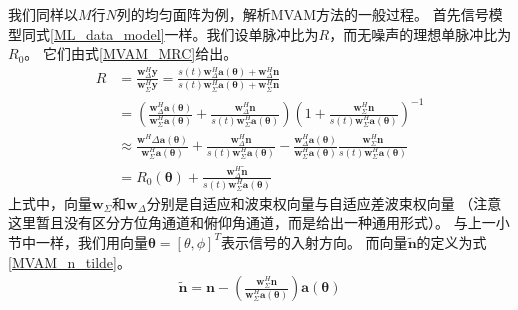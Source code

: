 \documentclass[master]{thesis-uestc}
\begin{document}
我们同样以$M$行$N$列的均匀面阵为例，解析MVAM方法的一般过程。
首先信号模型同式\eqref{ML_data_model}一样。我们设单脉冲比为$R$，而无噪声的理想单脉冲比为$R_0$。
它们由式\eqref{MVAM_MRC}给出。
\begin{equation}\label{MVAM_MRC}
    \begin{aligned}
        R &= \frac{\bm{w}^H_\Delta\bm{y}}{\bm{w}^H_\Sigma\bm{y}}
        = \frac{s(t)\bm{w}^H_\Delta\bm{a}(\bm{\theta}) + \bm{w}^H_\Delta\bm{n}}
               {s(t)\bm{w}^H_\Sigma\bm{a}(\bm{\theta}) + \bm{w}^H_\Sigma\bm{n}} \\
        &= \left(
                \frac{\bm{w}^H_\Delta\bm{a}(\bm{\theta})}{\bm{w}^H_\Sigma\bm{a}(\bm{\theta})} + 
                \frac{\bm{w}^H_\Delta\bm{n}}{s(t)\bm{w}^H_\Sigma\bm{a}(\bm{\theta})}
           \right)
           \left(1 + \frac{\bm{w}^H_\Sigma\bm{n}}{s(t)\bm{w}^H_\Sigma\bm{a}(\bm{\theta})}\right)^{-1} \\
        &\approx \frac{\bm{w}^H\Delta\bm{a}(\bm{\theta})}{\bm{w}^H_\Sigma\bm{a}(\bm{\theta})} + 
                 \frac{\bm{w}^H_\Delta\bm{n}}{s(t)\bm{w}^H_\Sigma\bm{a}(\bm{\theta})} - 
                 \frac{\bm{w}^H_\Delta\bm{a}(\bm{\theta})}{\bm{w}^H_\Sigma\bm{a}(\bm{\theta})}
                 \frac{\bm{w}^H_\Sigma\bm{n}}{s(t)\bm{w}^H_\Sigma\bm{a}(\bm{\theta})} \\
        &= R_0(\bm{\theta}) + \frac{\bm{w}^H_\Delta\tilde{\bm{n}}}{s(t)\bm{w}^H_\Sigma\bm{a}(\bm{\theta})}
    \end{aligned}
\end{equation}
上式中，向量$\bm{w}_\Sigma$和$\bm{w}_\Delta$分别是自适应和波束权向量与自适应差波束权向量
（注意这里暂且没有区分方位角通道和俯仰角通道，而是给出一种通用形式）。
与上一小节中一样，我们用向量$\bm{\theta}=\left[\theta,\phi\right]^T$表示信号的入射方向。
而向量$\tilde{\bm{n}}$的定义为式\eqref{MVAM_n_tilde}。
\begin{equation}\label{MVAM_n_tilde}
    \begin{aligned}
        \tilde{\bm{n}} = \bm{n} - 
        \left(\frac{\bm{w}^H_\Sigma\bm{n}}{\bm{w}^H_\Sigma\bm{a}(\bm{\theta})}\right)\bm{a}(\bm{\theta})
    \end{aligned}
\end{equation}
\end{document}
